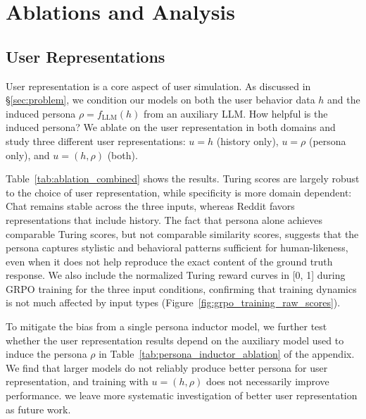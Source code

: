 \documentclass{article} %
\newcommand{\llq}[1]{{\color{cyan}[linlu: #1]}}
\begin{document}
\section{Ablations and Analysis}
\subsection{User Representations}
User representation is a core aspect of user simulation. As discussed in \S\ref{sec:problem}, we condition our models on both the user behavior data $h$ and the induced persona $\rho = f_{\text{LLM}}(h)$ from an auxiliary LLM. How helpful is the induced persona? We ablate on the user representation in both domains and study three different user representations: $u = h$ (history only), $u = \rho$ (persona only), and $u = (h, \rho)$ (both).

Table~\ref{tab:ablation_combined} shows the results. Turing scores are largely robust to the choice of user representation, while specificity is more domain dependent: Chat remains stable across the three inputs, whereas Reddit favors representations that include history. The fact that persona alone achieves comparable Turing scores, but not comparable similarity scores, suggests that the persona captures stylistic and behavioral patterns sufficient for human-likeness, even when it does not help reproduce the exact content of the ground truth response. We also include the normalized Turing reward curves in [0, 1] during GRPO training for the three input conditions, confirming that training dynamics is not much affected by input types (Figure~\ref{fig:grpo_training_raw_scores}).

To mitigate the bias from a single persona inductor model, we further test whether the user representation results depend on the auxiliary model used to induce the persona $\rho$ in Table~\ref{tab:persona_inductor_ablation} of the appendix. We find that larger models do not reliably produce better persona for user representation, and training with $u=(h, \rho)$ does not necessarily improve performance. we leave more systematic investigation of better user representation as future work.
\end{document}
